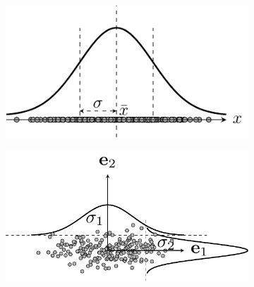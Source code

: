  
 \begin{figure}[t]
     \begin{subfigure}{0.325\textwidth}
     \includegraphics[width=0.99\linewidth]{Chapters/07_DimemsionalityReduction/27_pca/latex/var_1d.pdf}
     \caption{}
     \label{fig:27_2a}
     \end{subfigure}
     \begin{subfigure}{0.325\textwidth}
     \includegraphics[width=0.99\linewidth]{Chapters/07_DimemsionalityReduction/27_pca/latex/pca_diagvar.pdf}
     \caption{}
     \label{fig:27_2b}
     \end{subfigure}
     \begin{subfigure}{0.325\textwidth}

\end{subfigure}
\end{figure}

